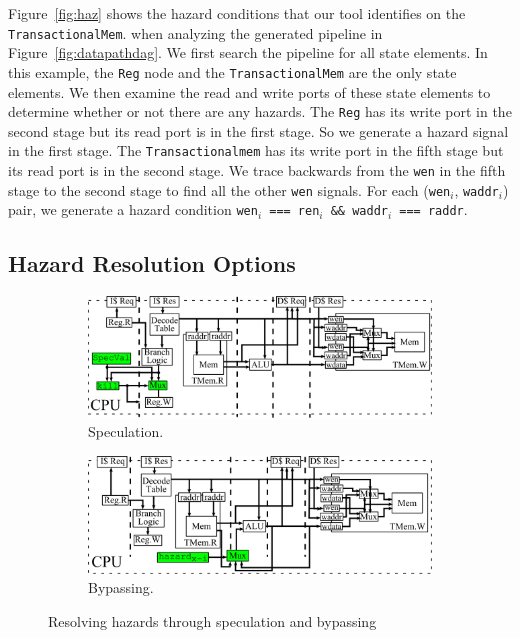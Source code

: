Figure~\ref{fig:haz} shows the hazard conditions that our tool
identifies on the {\tt TransactionalMem}. when analyzing the generated pipeline in
Figure~\ref{fig:datapathdag}. We first search the pipeline for all
state elements. In this example, the {\tt Reg} node and the 
{\tt TransactionalMem} are the only state elements. We then examine
the read and write ports of these state elements to determine whether
or not there are any hazards. The {\tt Reg} has its write port in the
second stage but its read port is in the first stage. So we generate a
hazard signal in the first stage. The {\tt Transactionalmem} has its
write port in the fifth stage but its read port is in the second
stage. We trace backwards from the {\tt wen} in the fifth stage to the
second stage to find all the other {\tt wen} signals. For each 
({\tt wen}$_i$, {\tt waddr}$_i$) pair, we generate a hazard condition
{\tt wen$_i$ === ren$_i$ \&\& waddr$_i$ === raddr}.

\subsection{Hazard Resolution Options}
\begin{figure}[htb]
\centering
  \begin{subfigure}[t]{0.8\textwidth}
  \centering
  \includegraphics[width=\textwidth]{figures/pipelinespec.pdf}
  \caption{Speculation.}
  \label{fig:spec}
  \end{subfigure}
  \begin{subfigure}[t]{0.8\textwidth}
  \vspace{20pt}
  \centering
  \includegraphics[width=\textwidth]{figures/pipelinebypass.pdf}
  \caption{Bypassing.}
  \label{fig:bypass}
  \end{subfigure}
\caption{Resolving hazards through speculation and bypassing}
\label{fig:specbyp}
\end{figure}

